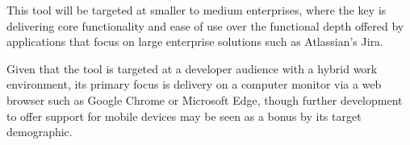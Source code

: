 \documentclass[l4proj.tex]{subfiles}
\begin{document}
This tool will be targeted at smaller to medium enterprises, where the key is delivering core functionality and ease of use over the functional depth offered by applications that focus on large enterprise solutions such as Atlassian’s Jira.

Given that the tool is targeted at a developer audience with a hybrid work environment, its primary focus is delivery on a computer monitor via a web browser such as Google Chrome or Microsoft Edge, though further development to offer support for mobile devices may be seen as a bonus by its target demographic.
\end{document}
